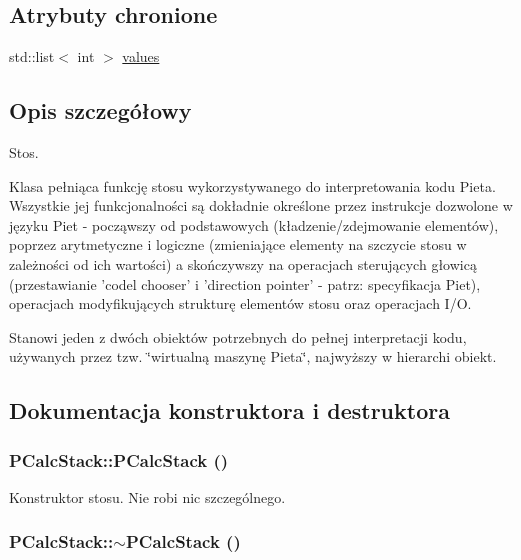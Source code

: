 \subsection*{Atrybuty chronione}
\begin{CompactItemize}
\item 
std::list$<$ int $>$ \hyperlink{classPCalcStack_4777b5f859158a71a18deb0bc0978653}{values}
\end{CompactItemize}


\subsection{Opis szczegółowy}
Stos. 

Klasa pełniąca funkcję stosu wykorzystywanego do interpretowania kodu Pieta. Wszystkie jej funkcjonalności są dokładnie określone przez instrukcje dozwolone w języku Piet - począwszy od podstawowych (kładzenie/zdejmowanie elementów), poprzez arytmetyczne i logiczne (zmieniające elementy na szczycie stosu w zależności od ich wartości) a skończywszy na operacjach sterujących głowicą (przestawianie 'codel chooser' i 'direction pointer' - patrz: specyfikacja Piet), operacjach modyfikujących strukturę elementów stosu oraz operacjach I/O.

Stanowi jeden z dwóch obiektów potrzebnych do pełnej interpretacji kodu, używanych przez tzw. \char`\"{}wirtualną maszynę Pieta\char`\"{}, najwyższy w hierarchi obiekt. 

\subsection{Dokumentacja konstruktora i destruktora}
\hypertarget{classPCalcStack_cc7266cec193eaee5770560743e0b4f2}{
\subsubsection[{PCalcStack}]{\setlength{\rightskip}{0pt plus 5cm}PCalcStack::PCalcStack ()}}
\label{classPCalcStack_cc7266cec193eaee5770560743e0b4f2}


Konstruktor stosu. Nie robi nic szczególnego. \hypertarget{classPCalcStack_0576403e030755933fa56263aed99765}{
\subsubsection[{$\sim$PCalcStack}]{\setlength{\rightskip}{0pt plus 5cm}PCalcStack::$\sim$PCalcStack ()}}
\label{classPCalcStack_0576403e030755933fa56263aed99765}


